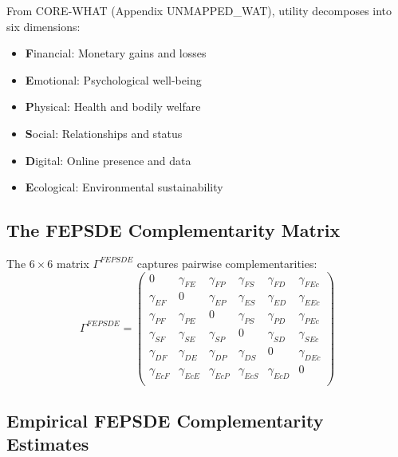 From CORE-WHAT (Appendix UNMAPPED_WAT), utility decomposes into six dimensions:
\begin{itemize}[noitemsep]
    \item \textbf{F}inancial: Monetary gains and losses
    \item \textbf{E}motional: Psychological well-being
    \item \textbf{P}hysical: Health and bodily welfare
    \item \textbf{S}ocial: Relationships and status
    \item \textbf{D}igital: Online presence and data
    \item \textbf{E}cological: Environmental sustainability
\end{itemize}

\subsection{The FEPSDE Complementarity Matrix}

\begin{definition}
The $6 \times 6$ matrix $\Gamma^{FEPSDE}$ captures pairwise complementarities:
\begin{equation}
\Gamma^{FEPSDE} = \begin{pmatrix}
0 & \gamma_{FE} & \gamma_{FP} & \gamma_{FS} & \gamma_{FD} & \gamma_{FEc} \\
\gamma_{EF} & 0 & \gamma_{EP} & \gamma_{ES} & \gamma_{ED} & \gamma_{EEc} \\
\gamma_{PF} & \gamma_{PE} & 0 & \gamma_{PS} & \gamma_{PD} & \gamma_{PEc} \\
\gamma_{SF} & \gamma_{SE} & \gamma_{SP} & 0 & \gamma_{SD} & \gamma_{SEc} \\
\gamma_{DF} & \gamma_{DE} & \gamma_{DP} & \gamma_{DS} & 0 & \gamma_{DEc} \\
\gamma_{EcF} & \gamma_{EcE} & \gamma_{EcP} & \gamma_{EcS} & \gamma_{EcD} & 0 \\
\end{pmatrix}
\end{equation}
\end{definition}

\subsection{Empirical FEPSDE Complementarity Estimates}

